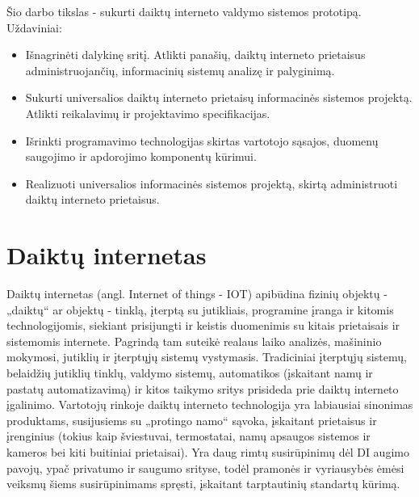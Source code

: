 \documentclass{VUMIFInfBakalaurinis}
\begin{document}
\par Šio darbo tikslas - sukurti daiktų interneto valdymo sistemos prototipą.
Uždaviniai:
\begin{itemize}
  \item Išnagrinėti dalykinę sritį. Atlikti panašių, daiktų interneto prietaisus administruojančių, informacinių sistemų analizę ir palyginimą.
  \item Sukurti universalios daiktų interneto prietaisų informacinės sistemos projektą. Atlikti reikalavimų ir projektavimo specifikacijas.
  \item Išrinkti programavimo technologijas skirtas vartotojo sąsajos, duomenų saugojimo ir apdorojimo komponentų kūrimui.
  \item Realizuoti universalios informacinės sistemos projektą, skirtą administruoti daiktų interneto prietaisus.
\end{itemize}

\section{Daiktų internetas}
Daiktų internetas (angl. Internet of things - IOT) apibūdina fizinių objektų - „daiktų“ ar objektų - tinklą, įterptą su jutikliais, programine įranga ir kitomis technologijomis, siekiant prisijungti ir keistis duomenimis su kitais prietaisais 
ir sistemomis internete. Pagrindą tam suteikė realaus laiko analizės, mašininio mokymosi, jutiklių ir įterptųjų sistemų vystymasis. Tradiciniai įterptųjų sistemų, belaidžių jutiklių tinklų, valdymo sistemų, 
automatikos (įskaitant namų ir pastatų automatizavimą) ir kitos taikymo sritys prisideda prie daiktų interneto įgalinimo. Vartotojų rinkoje daiktų interneto technologija yra labiausiai sinonimas produktams,
susijusiems su „protingo namo“ sąvoka, įskaitant prietaisus ir įrenginius (tokius kaip šviestuvai, termostatai, namų apsaugos sistemos ir kameros bei kiti buitiniai prietaisai).
Yra daug rimtų susirūpinimų dėl DI augimo pavojų, ypač privatumo ir saugumo srityse, todėl pramonės ir vyriausybės ėmėsi veiksmų šiems susirūpinimams spręsti, įskaitant tarptautinių standartų kūrimą.
\end{document}
